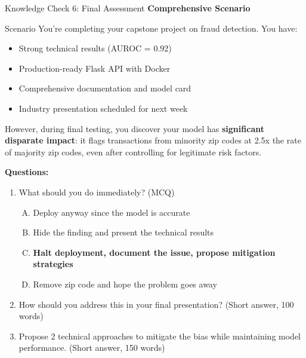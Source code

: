 \begin{frame}{Knowledge Check 6: Final Assessment}
\textbf{Comprehensive Scenario}

\vspace{0.2cm}

\begin{block}{Scenario}
\small
You're completing your capstone project on fraud detection. You have:
\begin{itemize}
\item Strong technical results (AUROC = 0.92)
\item Production-ready Flask API with Docker
\item Comprehensive documentation and model card
\item Industry presentation scheduled for next week
\end{itemize}

However, during final testing, you discover your model has \textbf{significant disparate impact}: it flags transactions from minority zip codes at 2.5x the rate of majority zip codes, even after controlling for legitimate risk factors.
\end{block}

\vspace{0.2cm}

\textbf{Questions:}
\begin{enumerate}
\item What should you do immediately? (MCQ)
\begin{enumerate}[A)]
\item Deploy anyway since the model is accurate
\item Hide the finding and present the technical results
\item \textcolor{forest}{\textbf{Halt deployment, document the issue, propose mitigation strategies}}
\item Remove zip code and hope the problem goes away
\end{enumerate}

\pause

\item How should you address this in your final presentation? (Short answer, 100 words)

\pause

\item Propose 2 technical approaches to mitigate the bias while maintaining model performance. (Short answer, 150 words)
\end{enumerate}

\end{frame}

